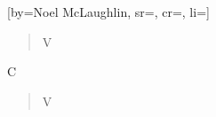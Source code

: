 [by={Noel McLaughlin}, sr={}, cr={}, li={}]

\begin{verse}
V
\end{verse}

\begin{chorus}
C
\end{chorus}

\chordsoff

\begin{verse}
V
\end{verse}

\endsong